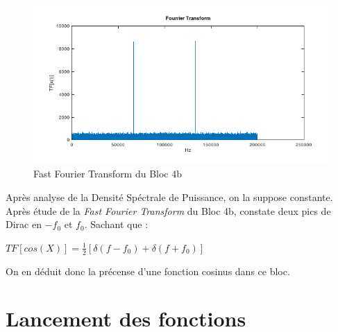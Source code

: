 \documentclass[french, a4paper, 12pt, openany]{book}
\begin{document}
	\begin{figure}[ht]
		\begin{center}
		\includegraphics[scale=0.5]{images/TFBloc4-2.png}
		\end{center}
		\caption{Fast Fourier Transform du Bloc 4b}
		\label{Fast Fourier Transform du Bloc 4b}
	\end{figure}

	Après analyse de la Densité Spéctrale de Puissance, on la suppose constante. \\
	Après étude de la \textit{Fast Fourier Transform} du Bloc 4b, constate deux pics de Dirac en \begin{math}-f_0 \end{math} et \begin{math}f_0\end{math}. Sachant que :
	\begin{center}
		\begin{math}TF[cos(X)] = \frac{1}{2}[\delta (f - f_0) + \delta (f + f_0)]\end{math}
	\end{center}
	On en déduit donc la précense d'une fonction cosinus dans ce bloc.


\chapter{Lancement des fonctions}
\end{document}
